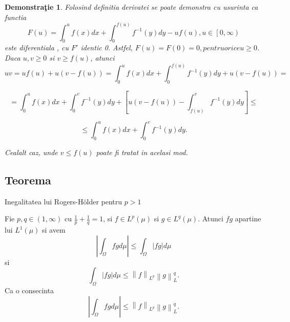 \documentclass[a4paper,12pt,oneside]{report}
\newtheorem{demonstration}{Demonstra\c tie}
\begin{document}
\begin{demonstration}
Folosind definitia derivatei se poate demonstra cu usurinta ca functia 
\begin{displaymath}
  F\left ( u \right )= \int_{0}^{u}f\left ( x \right )dx + \int_{0}^{f\left ( u \right )}f^{-1}\left ( y \right )dy -uf\left ( u \right ), u \in \left [ 0,\infty  \right )
\end{displaymath}
este diferentiala , cu \({F}'\) identic 0. Astfel, \(F\left ( u \right )= F\left ( 0 \right )= 0, pentru orice u\geq 0\). 
	Daca \(u, v \geq 0\)  si \(v\geq f\left ( u \right )\), atunci 
\begin{displaymath}
  uv = uf\left ( u \right )+ u\left ( v- f\left ( u \right ) \right )=  \int_{0}^{u}f\left ( x \right )dx + \int_{0}^{f\left ( u \right )}f^{-1}\left ( y \right )dy + u\left ( v - f\left ( u \right ) \right ) =
\end{displaymath}

\begin{displaymath}
  = \int_{0}^{u}f\left ( x \right )dx + \int_{0}^{v}f^{-1}\left ( y \right )dy + \left [ u\left ( v-f\left ( u \right )  \right ) - \int_{f\left ( u \right )}^{v}f^{-1}\left ( y \right )dy\right ]\leq 
\end{displaymath}

\begin{displaymath}
  \leq \int_{0}^{u}f\left ( x \right )dx + \int_{0}^{v}f^{-1}\left ( y \right )dy.
\end{displaymath}



	Cealalt caz, unde \(v\leq f\left ( u \right )\) poate fi tratat in acelasi mod. 
\end{demonstration}

\subsection{Teorema}

Inegalitatea lui Rogers-Hölder pentru \(p > 1\)

Fie \(p,q \in \left ( 1, \infty  \right )\) cu \(\frac{1}{p} + \frac{1}{q} = 1\), si  \(f\in L^{p}\left ( \mu  \right )\) si \(g\in L^{q}\left ( \mu  \right )\). Atunci \(fg\) apartine lui \(L^{1}\left ( \mu  \right )\) si avem 
\begin{displaymath}
  \left | \int_{\Omega}^{} fg  d\mu \right |\leq \int_{\Omega}^{}\left | fg \right |d\mu \label{eq:1.6} \tag{1.6}
\end{displaymath}
si 
\begin{displaymath}
  \int_{\Omega}^{}\left | fg \right |d\mu \leq \left \| f \right \|_{L^{p}}\left \| g \right \|_{L}^{q} . \label{eq:1.7} \tag{1.7}
\end{displaymath}
Ca o consecinta 
\begin{displaymath}
  \left | \int_{\Omega}^{} fg  d\mu \right |\leq \left \| f \right \|_{L^{p}}\left \| g \right \|_{L}^{q}. \label{eq:1.8} \tag{1.8}
\end{displaymath}
\end{document}
